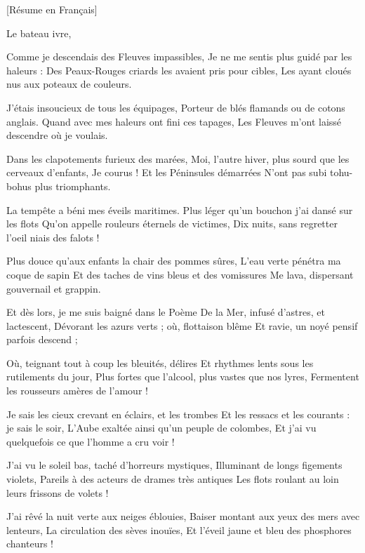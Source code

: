[Résume en Français]\newline \newline

Le bateau ivre,  \newline \newline


Comme je descendais des Fleuves impassibles,
Je ne me sentis plus guidé par les haleurs :
Des Peaux-Rouges criards les avaient pris pour cibles,
Les ayant cloués nus aux poteaux de couleurs.

J'étais insoucieux de tous les équipages,
Porteur de blés flamands ou de cotons anglais.
Quand avec mes haleurs ont fini ces tapages,
Les Fleuves m'ont laissé descendre où je voulais.

Dans les clapotements furieux des marées,
Moi, l'autre hiver, plus sourd que les cerveaux d'enfants,
Je courus ! Et les Péninsules démarrées
N'ont pas subi tohu-bohus plus triomphants.

La tempête a béni mes éveils maritimes.
Plus léger qu'un bouchon j'ai dansé sur les flots
Qu'on appelle rouleurs éternels de victimes,
Dix nuits, sans regretter l'oeil niais des falots !

Plus douce qu'aux enfants la chair des pommes sûres,
L'eau verte pénétra ma coque de sapin
Et des taches de vins bleus et des vomissures
Me lava, dispersant gouvernail et grappin.

Et dès lors, je me suis baigné dans le Poème
De la Mer, infusé d'astres, et lactescent,
Dévorant les azurs verts ; où, flottaison blême
Et ravie, un noyé pensif parfois descend ;

Où, teignant tout à coup les bleuités, délires
Et rhythmes lents sous les rutilements du jour,
Plus fortes que l'alcool, plus vastes que nos lyres,
Fermentent les rousseurs amères de l'amour !

Je sais les cieux crevant en éclairs, et les trombes
Et les ressacs et les courants : je sais le soir,
L'Aube exaltée ainsi qu'un peuple de colombes,
Et j'ai vu quelquefois ce que l'homme a cru voir !

J'ai vu le soleil bas, taché d'horreurs mystiques,
Illuminant de longs figements violets,
Pareils à des acteurs de drames très antiques
Les flots roulant au loin leurs frissons de volets !

J'ai rêvé la nuit verte aux neiges éblouies,
Baiser montant aux yeux des mers avec lenteurs,
La circulation des sèves inouïes,
Et l'éveil jaune et bleu des phosphores chanteurs !

